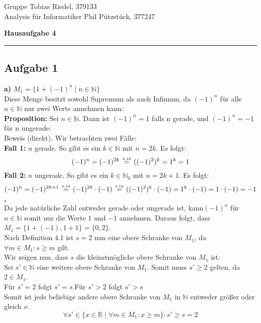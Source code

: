 \documentclass[a4paper,graphics,11pt]{article}
\newcommand{\aufgabe}[1]{\subsection*{Aufgabe #1}}
\newcommand{\up}[2]{\mathrel{\overset{\makebox[0pt]{\mbox{\normalfont\tiny #2}}}{#1}}}
\begin{document}
\noindent Gruppe              \hfill Tobias Riedel, 379133 \\
\noindent Analysis für Informatiker             \hfill Phil Pützstück, 377247 \\

\begin{center}
	\LARGE{\textbf{Hausaufgabe 4}}
\end{center}
\begin{center}
\rule[0.1ex]{\textwidth}{1pt}
\end{center}



\aufgabe{1}
\textbf{a)} 
$M_1 = \{1+(-1)^n\mid n\in \mathbb{N}\}$\\[1pt]
Diese Menge besitzt sowohl Supremum als auch Infimum, da $(-1)^n$ für alle
$n \in \mathbb{N}$ nur zwei Werte annehmen kann:\\[5pt]
\textbf{Proposition:} Sei $n \in \mathbb{N}$. Dann ist $(-1)^n = 1$ falls n gerade, und 
$(-1)^n = -1$ für n ungerade:\\
Beweis (direkt). Wir betrachten zwei Fälle:\\
\textbf{Fall 1:} $n$ gerade. So gibt es ein $k \in \mathbb{N}$ mit $n = 2k$. Es folgt:
$$ (-1)^n = (-1)^{2k} \up{\ =\ }{4.16} ((-1)^{2})^k = 1^k = 1$$ 
\textbf{Fall 2:} $n$ ungerade. So gibt es ein $k \in \mathbb{N}_0$ mit $n = 2k+1$. Es folgt:
$$
    (-1)^n = (-1)^{2k+1} \up{\ =\ }{4.16} (-1)^{2k}\cdot (-1)
    \up{\ =\ }{4.16} ((-1)^2)^k \cdot (-1) = 1^k \cdot (-1) = 1\cdot (-1) = -1
$$
\strut\hfill $\square$\\[5pt]
Da jede natürliche Zahl entweder gerade oder ungerade ist, kann$(-1)^n$ für $n\in \mathbb{N}$ somit nur die Werte $1$ und $-1$ annehmen.
Daraus folgt, dass $M_1 = \{1+(-1), 1+1\} = \{0,2\}$.\\
Nach Definition 4.1 ist $s = 2$ nun eine obere Schranke von $M_1$, da $\forall m\in M_1\colon s\geq m$ gilt.\\
Wir zeigen nun, dass $s$ die kleinstmögliche obere Schranke von $M_1$ ist:\\[2pt]
Sei $s' \in \mathbb{N}$ eine weitere obere Schranke von $M_1$. Somit muss $s' \geq 2$ gelten, da $2 \in M_1$.\\
Für $s' = 2$ folgt $s' = s$.\quad Für $s' > 2$ folgt $s' > s$\\
Somit ist jede beliebige andere obere Schranke von $M_1$  in $\mathbb{N}$ entweder größer oder
gleich $s$:
$$
    \forall s' \in \{x \in \mathbb{R} \mid \forall m \in M_1\colon x \geq m\} \colon s' \geq s = 2
$$
\end{document}
